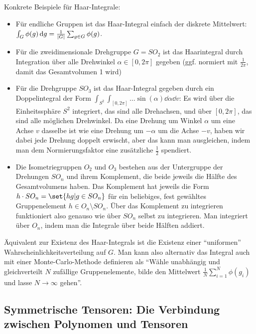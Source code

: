 \begin{definition}
	Konkrete Beispiele für Haar-Integrale:
	
	\begin{itemize}
	\item Für endliche Gruppen ist das Haar-Integral einfach der diskrete Mittelwert: $\int_G \phi(g) \,\textrm{d} g = \frac{1}{\lvert G\rvert} \sum_{g\in G} \phi(g)$.
	\item Für die zweidimensionale Drehgruppe $G=SO_2$ ist das Haarintegral durch Integration über alle Drehwinkel $\alpha\in[0,2\pi]$ gegeben (ggf. normiert mit $\frac{1}{2\pi}$, damit das Gesamtvolumen 1 wird)
	\item Für die Drehgruppe $SO_3$ ist das Haar-Integral gegeben durch ein Doppelintegral der Form $\int_{S^2} \int_{[0,2\pi]} \ldots \sin(\alpha)\dd \alpha \dd v$: Es wird über die Einheitssphäre $S^2$ integriert, das sind alle Drehachsen, und über $[0,2\pi]$, das sind alle möglichen Drehwinkel. Da eine Drehung um Winkel $\alpha$ um eine Achse $v$ dasselbe ist wie eine Drehung um $-\alpha$ um die Achse $-v$, haben wir dabei jede Drehung doppelt erwischt, aber das kann man ausgleichen, indem man dem Normierungsfaktor eine zusätzliche $\frac{1}{2}$ spendiert.
	\item Die Isometriegruppen $O_2$ und $O_3$ bestehen aus der Untergruppe der Drehungen $SO_n$ und ihrem Komplement, die beide jeweils die Hälfte des Gesamtvolumens haben. Das Komplement hat jeweils die Form $h\cdot SO_n = \set{hg | g\in SO_n}$ für ein beliebiges, fest gewähltes Gruppenelement $h\in O_n \setminus SO_n$. Über das Komplement zu integrieren funktioniert also genauso wie über $SO_n$ selbst zu integrieren. Man integriert über $O_n$, indem man die Integrale über beide Hälften addiert.
	\end{itemize}
	
	Äquivalent zur Existenz des Haar-Integrals ist die Existenz einer \enquote{uniformen} Wahrscheinlichkeitsverteilung auf $G$. Man kann also alternativ das Integral auch mit einer Monte-Carlo-Methode definieren als \enquote{Wähle unabhängig und gleichverteilt $N$ zufällige Gruppenelemente, bilde den Mittelwert $\frac{1}{N} \sum_{i=1}^N \phi(g_i)$ und lasse $N\to\infty$ gehen}.
\end{definition}

\subsection{Symmetrische Tensoren: Die Verbindung zwischen Polynomen und Tensoren}

